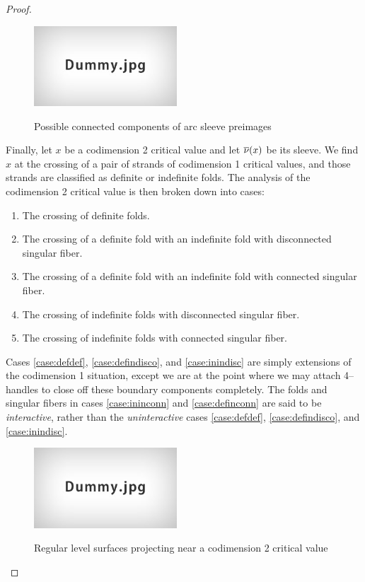 \begin{proof}
	\begin{figure}
		\centering
		\captionsetup{justification=centering}
		\caption{Possible connected components of arc sleeve preimages}
		\includegraphics[height=3cm]{figures/dummy.jpg}
		\label{fig:arcsleevepre}
	\end{figure}
	
	Finally, let $x$ be a codimension 2 critical value and let $\overline{\nu}(x)$ be its sleeve.
	We find $x$ at the crossing of a pair of strands of codimension 1 critical values, and those strands are classified as definite or indefinite folds.
	The analysis of the codimension 2 critical value is then broken down into cases:
	\begin{enumerate}[label=(\alph*)]
		\item \label{case:defdef} The crossing of definite folds.
		\item \label{case:defindisco} The crossing of a definite fold with an indefinite fold with disconnected singular fiber.
		\item \label{case:definconn} The crossing of a definite fold with an indefinite fold with connected singular fiber.
		\item \label{case:inindisc} The crossing of indefinite folds with disconnected singular fiber.
		\item \label{case:ininconn} The crossing of indefinite folds with connected singular fiber.
	\end{enumerate}
	Cases \ref{case:defdef}, \ref{case:defindisco}, and \ref{case:inindisc} are simply extensions of the codimension 1 situation, except we are at the point where we may attach 4--handles to close off these boundary components completely.
	The folds and singular fibers in cases \ref{case:ininconn} and \ref{case:definconn} are said to be \emph{interactive}, rather than the \emph{uninteractive} cases \ref{case:defdef}, \ref{case:defindisco}, and \ref{case:inindisc}.
	
	\begin{figure}
		\centering
		\captionsetup{justification=centering}
		\caption{Regular level surfaces projecting near a codimension 2 critical value}
		\includegraphics[height=3cm]{figures/dummy.jpg}
		\label{fig:regprojcodim2}
	\end{figure}
	

\end{proof}
